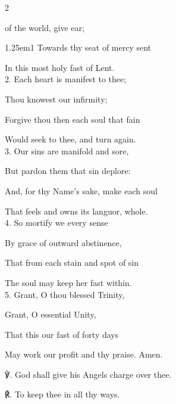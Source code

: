 \begin{multicols}{2}
	
 of the world, give ear;

\begin{hangparas}{1.25em}{1}
Towards thy seat of mercy sent

In this most holy fast of Lent.\\

2. Each heart is manifest to thee;

Thou knowest our infirmity;

Forgive thou then each soul that fain

Would seek to thee, and turn again.\\

3. Our sins are manifold and sore,

But pardon them that sin deplore:

And, for thy Name's sake, make each soul

That feels and owns its languor, whole.\\

4. So mortify we every sense

By grace of outward abstinence,

That from each stain and spot of sin

The soul may keep her fast within.\\

5. Grant, O thou blessed Trinity,

Grant, O essential Unity,

That this our fast of forty days

May work our profit and thy praise. Amen.\\
\end{hangparas}

℣. God shall give his Angels charge over thee.

℟. To keep thee in all thy ways.

\end{multicols}

\mattins



